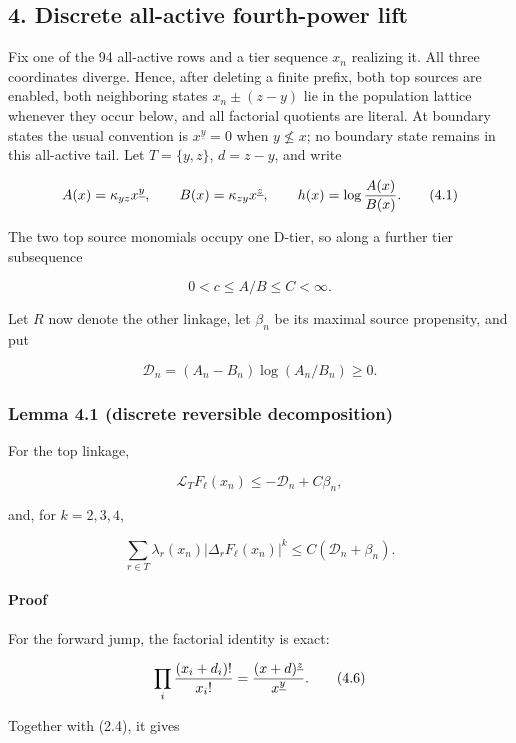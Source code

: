 \subsection{4. Discrete all-active fourth-power
lift}

Fix one of the 94 all-active rows and a tier sequence \(x_n\) realizing
it. All three coordinates diverge. Hence, after deleting a finite
prefix, both top sources are enabled, both neighboring states
\(x_n\pm(z-y)\) lie in the population lattice whenever they occur below,
and all factorial quotients are literal. At boundary states the usual
convention is \(x^{\underline y}=0\) when \(y\nleq x\); no boundary
state remains in this all-active tail. Let \(T=\{y,z\}\), \(d=z-y\), and
write

\[
 A(x)=\kappa_{yz}x^{\underline y},\qquad
 B(x)=\kappa_{zy}x^{\underline z},\qquad
 h(x)=\log{A(x)\over B(x)}.                         \tag{4.1}
\]

The two top source monomials occupy one D-tier, so along a further tier
subsequence

\[
 0<c\le A/B\le C<\infty.                            \tag{4.2}
\]

Let \(R\) now denote the other linkage, let \(\beta_n\) be its maximal
source propensity, and put

\[
 \mathcal D_n=(A_n-B_n)\log(A_n/B_n)\ge0.           \tag{4.3}
\]

\subsubsection{Lemma 4.1 (discrete reversible
decomposition)}

For the top linkage,

\[
 \mathcal L_TF_\ell(x_n)
 \le-\mathcal D_n+C\beta_n,                         \tag{4.4}
\]

and, for \(k=2,3,4\),

\[
 \sum_{r\in T}\lambda_r(x_n)|\Delta_rF_\ell(x_n)|^k
 \le C(\mathcal D_n+\beta_n).                      \tag{4.5}
\]

\paragraph{Proof}

For the forward jump, the factorial identity is exact:

\[
 \prod_i{(x_i+d_i)!\over x_i!}
 ={(x+d)^{\underline z}\over x^{\underline y}}.   \tag{4.6}
\]

Together with (2.4), it gives

